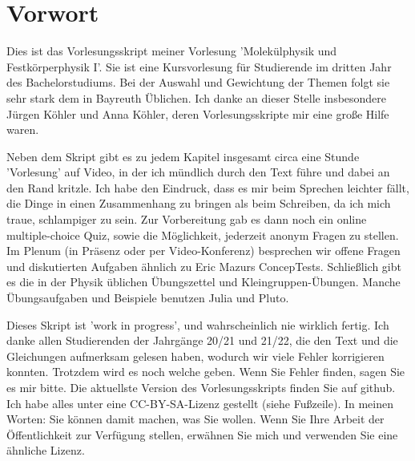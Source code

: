 \renewcommand{\lastmod}{\ \ }
\renewcommand{\chapterauthors}{\ \ }

\chapter*{Vorwort}

Dies ist das Vorlesungsskript meiner Vorlesung 'Molekülphysik und Festkörperphysik I'. Sie ist eine Kursvorlesung für  Studierende im dritten Jahr des Bachelorstudiums. Bei der Auswahl und Gewichtung der Themen folgt sie sehr stark dem in Bayreuth Üblichen. Ich danke an dieser Stelle insbesondere Jürgen Köhler und Anna Köhler, deren Vorlesungsskripte mir eine große Hilfe waren.

Neben dem Skript gibt es zu jedem Kapitel  insgesamt circa eine Stunde 'Vorlesung' auf Video, in der ich mündlich durch den Text führe und dabei an den Rand kritzle.
Ich habe den Eindruck, dass es mir beim Sprechen leichter fällt, die Dinge in einen Zusammenhang zu bringen als beim Schreiben, da ich mich traue, schlampiger zu sein. Zur Vorbereitung gab es dann noch ein online multiple-choice Quiz, sowie die Möglichkeit, jederzeit anonym Fragen zu stellen.  Im Plenum (in Präsenz oder per Video-Konferenz) besprechen wir offene Fragen und diskutierten Aufgaben ähnlich zu Eric Mazurs 
ConcepTests.  Schließlich gibt es die in der Physik üblichen Übungszettel und Kleingruppen-Übungen. Manche Übungsaufgaben und Beispiele benutzen Julia  und Pluto. 



Dieses Skript ist 'work in progress', und wahrscheinlich nie wirklich fertig.  Ich danke allen Studierenden der Jahrgänge 20/21 und 21/22, die den Text und die Gleichungen aufmerksam gelesen haben, wodurch wir viele Fehler korrigieren konnten. Trotzdem wird es noch welche geben. Wenn Sie Fehler finden, sagen Sie es mir bitte. 
Die aktuellste Version des Vorlesungsskripts finden Sie auf github.  Ich habe alles unter eine CC-BY-SA-Lizenz gestellt (siehe Fußzeile). In meinen Worten: Sie können damit machen, was Sie wollen. Wenn Sie Ihre Arbeit der Öffentlichkeit zur Verfügung stellen, erwähnen Sie mich und verwenden Sie eine ähnliche Lizenz. 


